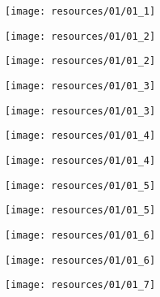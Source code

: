\begin{frame}{ }
    \centering
    \texttt{[image: resources/01/01\_1]}
\end{frame}
\begin{frame}{ }
    \centering
    \texttt{[image: resources/01/01\_2]}
\end{frame}
\begin{frame}{ }
    \centering
    \texttt{[image: resources/01/01\_2]}
\end{frame}
\begin{frame}{ }
    \centering
    \texttt{[image: resources/01/01\_3]}
\end{frame}
\begin{frame}{ }
    \centering
    \texttt{[image: resources/01/01\_3]}
\end{frame}
\begin{frame}{ }
    \centering
    \texttt{[image: resources/01/01\_4]}
\end{frame}
\begin{frame}{ }
    \centering
    \texttt{[image: resources/01/01\_4]}
\end{frame}
\begin{frame}{ }
    \centering
    \texttt{[image: resources/01/01\_5]}
\end{frame}
\begin{frame}{ }
    \centering
    \texttt{[image: resources/01/01\_5]}
\end{frame}
\begin{frame}{ }
    \centering
    \texttt{[image: resources/01/01\_6]}
\end{frame}
\begin{frame}{ }
    \centering
    \texttt{[image: resources/01/01\_6]}
\end{frame}
\begin{frame}{ }
    \centering
    \texttt{[image: resources/01/01\_7]}
\end{frame}
